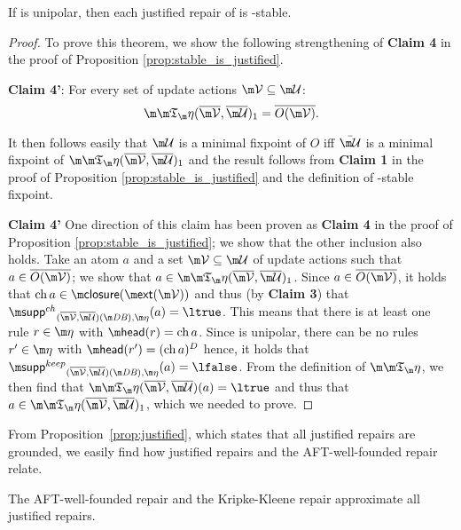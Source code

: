 \begin{proposition}\label{prop:justified_is_stable_sometimes}
If \aics is unipolar, then each justified repair of \fulldb is \Ap-stable. 
\end{proposition}
\begin{proof}
 To prove this theorem, we show the following strengthening of \textbf{Claim 4} in the proof of Proposition \ref{prop:stable_is_justified}. 
 \begin{compactdesc}
  \item \textbf{Claim 4'}: For every set of update actions $\VV\subseteq \UU$: 
 \[\Ap(\overline\VV,\overline\UU)_1= \overline{O(\VV)}.\] 
\end{compactdesc}
 It then follows easily that $\UU$ is a minimal fixpoint of $O$ iff $\bar\UU$ is a minimal fixpoint of $\Ap(\overline\VV,\overline\UU)_1$ and the result follows from \textbf{Claim 1} in the proof of Proposition \ref{prop:stable_is_justified} and the definition of \Ap-stable fixpoint. 
 
\textbf{Claim 4'}
One direction of this claim has been proven as \textbf{Claim 4} in the proof of Proposition \ref{prop:stable_is_justified}; we show that the other inclusion also holds.
 Take an atom $a$ and a set $\VV\subseteq\UU$ of update actions such that $a\in \overline{O(\VV)}$; we show that $a\in\Ap(\overline\VV,\overline\UU)_1$. Since $a\in\overline{O(\VV)}$, it holds that $\change a\in \closure(\ext(\VV))$ and thus (by \textbf{Claim 3}) that $\suppin_{(\overline\VV,\overline\UU)(\db),\aics}(a)=\ltrue$. This means that there is at least one rule $r\in\aics$ with $\head(r)=\change a$. Since \aics is unipolar, there can be no rules $r'\in\aics$ with $\head(r') = (\change a)^D$ hence, it holds that $\suppout_{(\overline\VV,\overline\UU)(\db),\aics}(a)=\lfalse$. From the definition of $\Ap$, we then find that $\Ap(\overline\VV,\overline\UU)(a)=\ltrue$ and thus that  $a\in \Ap(\overline\VV,\overline\UU)_1$, which we needed to prove. 
\qedhere
\end{proof}

From Proposition~\ref{prop:justified}, which states that all justified repairs are grounded, we easily find how justified repairs and the AFT-well-founded repair relate. 




\begin{corollary}
 The AFT-well-founded repair and the Kripke-Kleene repair approximate all justified repairs. 
\end{corollary}

